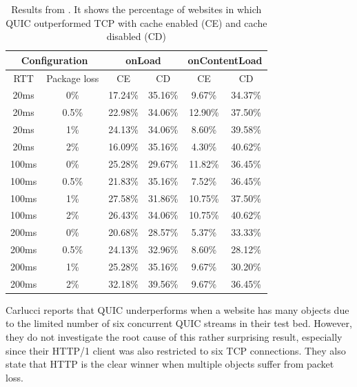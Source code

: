 \documentclass[conference]{IEEEtran}
\begin{document}
\begin{table}
\begin{center}
\begin{tabular}{|cc|cc|cc|}
\hline

\multicolumn{2}{|c|}{\textbf{Configuration}} & 
\multicolumn{2}{|c|}{\textbf{onLoad}} & 
\multicolumn{2}{|c|}{\textbf{onContentLoad}} \\
\hline

RTT & Package loss & CE & CD & CE & CD \\
\hline

20ms  & 0\%   & 17.24\% & 35.16\% & 9.67\%  & 34.37\% \\
20ms  & 0.5\% & 22.98\% & 34.06\% & 12.90\% & 37.50\% \\
20ms  & 1\%   & 24.13\% & 34.06\% & 8.60\%  & 39.58\% \\
20ms  & 2\%   & 16.09\% & 35.16\% & 4.30\%  & 40.62\% \\
100ms & 0\%   & 25.28\% & 29.67\% & 11.82\% & 36.45\% \\
100ms & 0.5\% & 21.83\% & 35.16\% & 7.52\%  & 36.45\% \\
100ms & 1\%   & 27.58\% & 31.86\% & 10.75\% & 37.50\% \\
100ms & 2\%   & 26.43\% & 34.06\% & 10.75\% & 40.62\% \\
200ms & 0\%   & 20.68\% & 28.57\% & 5.37\%  & 33.33\% \\
200ms & 0.5\% & 24.13\% & 32.96\% & 8.60\%  & 28.12\% \\
200ms & 1\%   & 25.28\% & 35.16\% & 9.67\%  & 30.20\% \\
200ms & 2\%   & 32.18\% & 39.56\% & 9.67\%  & 36.45\% \\
\hline

\end{tabular}
\end{center}

\caption{Results from \cite{Nepomuceno}. It shows the percentage of websites in which QUIC outperformed TCP with cache enabled (CE) and cache disabled (CD)}
\label{table:nepomuceno-results}
\end{table}

Carlucci \cite{HTTPoverUDP} reports that QUIC underperforms when a website has many objects due to the limited number of six concurrent QUIC streams in their test bed. However, they do not investigate the root cause of this rather surprising result, especially since their HTTP/1 client was also restricted to six TCP connections. They also state that HTTP is the clear winner when multiple objects suffer from packet loss.
\end{document}
